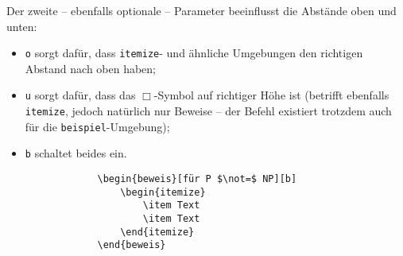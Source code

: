 			
			\vspace*{.5em}
			Der zweite -- ebenfalls optionale -- Parameter beeinflusst die Abstände oben und unten:
			\begin{itemize}
				\item \texttt o sorgt dafür, dass \texttt{itemize}- und ähnliche Umgebungen den richtigen Abstand nach oben haben;
				\item \texttt u sorgt dafür, dass das $\Box$-Symbol auf richtiger Höhe ist (betrifft ebenfalls \texttt{itemize}, jedoch natürlich nur Beweise -- der Befehl existiert trotzdem auch für die \texttt{beispiel}-Umgebung);
				\item \texttt b schaltet beides ein.
			\end{itemize}
			
			\newpage
			
			\begin{verbatim}
				\begin{beweis}[für P $\not=$ NP][b]
				    \begin{itemize} 
				        \item Text 
				        \item Text 
				    \end{itemize}
				\end{beweis}
			\end{verbatim}
			
			
